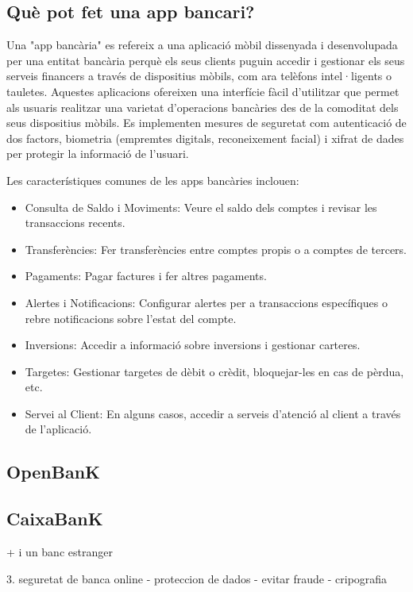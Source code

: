 \subsection*{Què pot fet una app bancari?}

Una "app bancària" es refereix a una aplicació mòbil dissenyada i desenvolupada per una entitat bancària perquè els seus clients puguin accedir i gestionar els seus serveis financers a través de dispositius mòbils, com ara telèfons intel·ligents o tauletes. Aquestes aplicacions ofereixen una interfície fàcil d'utilitzar que permet als usuaris realitzar una varietat d'operacions bancàries des de la comoditat dels seus dispositius mòbils. Es implementen mesures de seguretat com autenticació de dos factors, biometria (empremtes digitals, reconeixement facial) i xifrat de dades per protegir la informació de l'usuari.

Les característiques comunes de les apps bancàries inclouen:

\begin{itemize}
    \item Consulta de Saldo i Moviments: Veure el saldo dels comptes i revisar les transaccions recents.
    \item Transferències: Fer transferències entre comptes propis o a comptes de tercers.
    \item  Pagaments: Pagar factures i fer altres pagaments.
    \item Alertes i Notificacions: Configurar alertes per a transaccions específiques o rebre notificacions sobre l'estat del compte.
    \item Inversions: Accedir a informació sobre inversions i gestionar carteres.
    \item Targetes: Gestionar targetes de dèbit o crèdit, bloquejar-les en cas de pèrdua, etc.
    \item Servei al Client: En alguns casos, accedir a serveis d'atenció al client a través de l'aplicació.
\end{itemize}



\subsection*{OpenBanK}





\subsection*{CaixaBanK}




+ i un banc estranger 



3. seguretat de banca online
    - proteccion de dados
    - evitar fraude
    - cripografia
